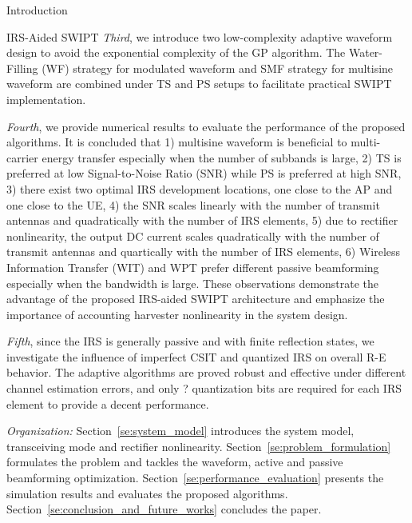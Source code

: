 \documentclass[journal]{IEEEtran}
\begin{document}
\begin{section}{Introduction}
\begin{subsection}{IRS-Aided SWIPT}
			\emph{Third}, we introduce two low-complexity adaptive waveform design to avoid the exponential complexity of the GP algorithm. The Water-Filling (WF) strategy for modulated waveform and SMF strategy for multisine waveform are combined under TS and PS setups to facilitate practical SWIPT implementation.

			\emph{Fourth}, we provide numerical results to evaluate the performance of the proposed algorithms. It is concluded that 1) multisine waveform is beneficial to multi-carrier energy transfer especially when the number of subbands is large, 2) TS is preferred at low Signal-to-Noise Ratio (SNR) while PS is preferred at high SNR, 3) there exist two optimal IRS development locations, one close to the AP and one close to the UE, 4) the SNR scales linearly with the number of transmit antennas and quadratically with the number of IRS elements, 5) due to rectifier nonlinearity, the output DC current scales quadratically with the number of transmit antennas and quartically with the number of IRS elements, 6) Wireless Information Transfer (WIT) and WPT prefer different passive beamforming especially when the bandwidth is large. These observations demonstrate the advantage of the proposed IRS-aided SWIPT architecture and emphasize the importance of accounting harvester nonlinearity in the system design.

			\emph{Fifth}, since the IRS is generally passive and with finite reflection states, we investigate the influence of imperfect CSIT and quantized IRS on overall R-E behavior. The adaptive algorithms are proved robust and effective under different channel estimation errors, and only ? quantization bits are required for each IRS element to provide a decent performance. %

			\emph{Organization:} Section~\ref{se:system_model} introduces the system model, transceiving mode and rectifier nonlinearity. Section~\ref{se:problem_formulation} formulates the problem and tackles the waveform, active and passive beamforming optimization. Section~\ref{se:performance_evaluation} presents the simulation results and evaluates the proposed algorithms. Section~\ref{se:conclusion_and_future_works} concludes the paper.


\end{subsection}
\end{section}
\end{document}
